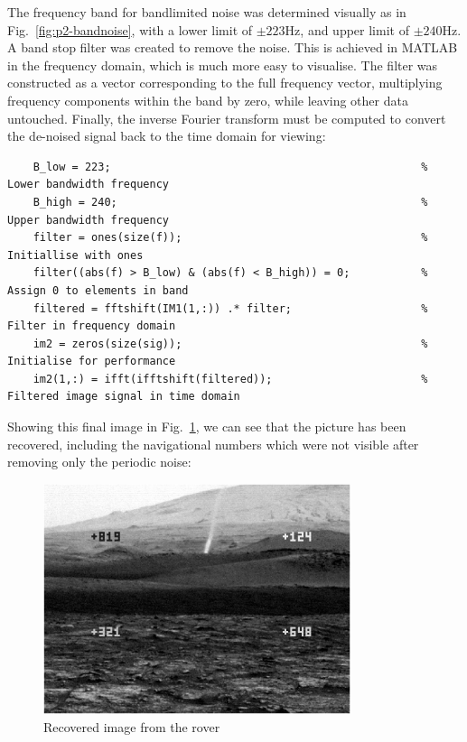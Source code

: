 \documentclass[12pt]{article}
\numberwithin{equation}{section}
\numberwithin{figure}{section}
\numberwithin{table}{section}
\begin{document}
The frequency band for bandlimited noise was determined visually as in
Fig.~\ref{fig:p2-bandnoise}, with a lower limit of $\pm 223$Hz, and upper limit
of $\pm 240$Hz. A band stop filter was created to remove the noise. This is
achieved in MATLAB in the frequency domain, which is much more easy to
visualise. The filter was constructed as a vector corresponding to the full
frequency vector, multiplying frequency components within the band by zero,
while leaving other data untouched. Finally, the inverse Fourier transform must
be computed to convert the de-noised signal back to the time domain for
viewing:
\begin{verbatim}
    B_low = 223;                                                % Lower bandwidth frequency
    B_high = 240;                                               % Upper bandwidth frequency
    filter = ones(size(f));                                     % Initiallise with ones
    filter((abs(f) > B_low) & (abs(f) < B_high)) = 0;           % Assign 0 to elements in band
    filtered = fftshift(IM1(1,:)) .* filter;                    % Filter in frequency domain
    im2 = zeros(size(sig));                                     % Initialise for performance
    im2(1,:) = ifft(ifftshift(filtered));                       % Filtered image signal in time domain
\end{verbatim}

Showing this final image in Fig.~\ref{fig:p2-im1recov}, we can see that the
picture has been recovered, including the navigational numbers which were not
visible after removing only the periodic noise:

\begin{figure}[ht]
    \centering
    \includegraphics[width=9cm]{figures/p2-im1recov.png}
    \caption{Recovered image from the rover\label{fig:p2-im1recov}}
\end{figure}
\end{document}
